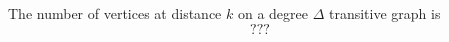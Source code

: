 \begin{lemma}
	The number of vertices at distance $k$ on a degree $\Delta$ transitive graph is
	\begin{equation}
		???
	\end{equation}
\end{lemma}

